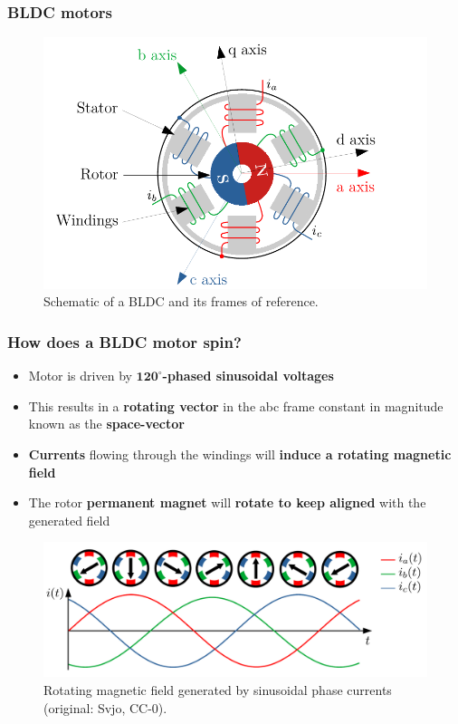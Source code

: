 \documentclass[handout]{beamer}
\begin{document}
\begin{frame}
  \frametitle{BLDC motors}

  \begin{figure}
    \centering
    \includegraphics[scale=0.6]{pmsm.pdf}
    \caption{Schematic of a BLDC and its frames of reference.}
  \end{figure}
\end{frame}

\begin{frame}
  \frametitle{How does a BLDC motor spin?}

  \begin{itemize}
    \item<1-> Motor is driven by $\mathbf{120^{\circ}}$\textbf{-phased
            sinusoidal voltages}
    \item<2-> This results in a \textbf{rotating vector} in the abc frame
          constant in magnitude known as the \textbf{space-vector}
    \item<3-> \textbf{Currents} flowing through the windings will \textbf{induce
            a rotating magnetic field}
    \item<4-> The rotor \textbf{permanent magnet} will \textbf{rotate to keep
            aligned} with the generated field
  \end{itemize}

  \begin{figure}
    \centering
    \includegraphics[scale=0.25]{rotating-magnetic-field.pdf}
    \caption{Rotating magnetic field generated by sinusoidal phase currents
      (original: Svjo, CC-0).}
  \end{figure}
\end{frame}
\end{document}
